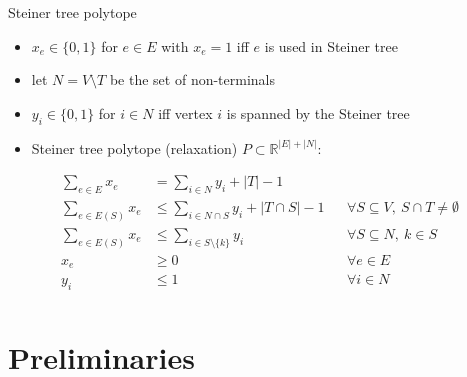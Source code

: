 \documentclass[usenames,dvipsnames]{beamer}
\newcommand{\R}{\mathbb{R}}
\newcommand{\Z}{\mathbb{Z}}
\begin{document}
\begin{frame}{Steiner tree polytope}
  \begin{itemize}
  \item $x_e \in \{0,1\}$ for $e \in E$ with $x_e = 1$ iff  $e$ is used in Steiner tree
  \item let $N = V \setminus T$ be the set of non-terminals
  \item $y_i \in \{0,1\}$ for $i \in N$ iff vertex $i$ is spanned by the Steiner tree
  \item Steiner tree polytope (relaxation) $P \subset \R^{|E| + |N|}$:
  \end{itemize}
  \begin{align*}
    \sum\limits_{e \in E} x_e &= \sum\limits_{i \in N} y_i + |T| - 1\\
    \sum\limits_{e \in E(S)} x_e &\leq \sum\limits_{i \in N \cap S} y_i + |T \cap S| -1 &&\forall S \subseteq V,~S \cap T \neq \emptyset\\
    \sum\limits_{e \in E(S)} x_e &\leq \sum\limits_{i \in S \setminus \{k\}} y_i &&\forall S \subseteq N,~k \in S\\
    x_e &\geq 0 &&\forall e \in E\\
    y_i & \leq 1 &&\forall i \in N\\
  \end{align*}
\end{frame}

\section{Preliminaries}

\end{document}
